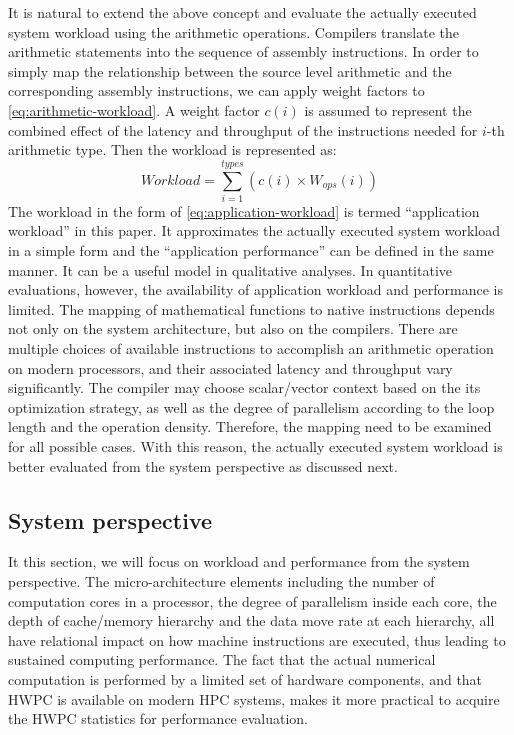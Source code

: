 \documentclass[conference]{IEEEtran}
\begin{document}
It is natural to extend the above concept and evaluate the actually executed
system workload using the arithmetic operations.
Compilers translate the arithmetic statements into the sequence of
assembly instructions.
In order to simply map the relationship between the source level arithmetic
and the corresponding assembly instructions,
we can apply weight factors to \eqref{eq:arithmetic-workload}.
A weight factor $ c(i) $ is assumed to represent the combined effect of
the latency and throughput of the instructions needed for $ i $-th
arithmetic type. %
Then the workload is represented as:
\begin{equation}\label{eq:application-workload}
		Workload = \sum_{i=1}^{types} \left(c(i)\times W_{ops}(i)\right)
\end{equation}
%
The workload in the form of \eqref{eq:application-workload}
is termed ``application workload'' in this paper.
It approximates the actually executed system workload in a simple form
and the ``application performance'' can be defined in the same manner.
It can be a useful model in qualitative analyses.
In quantitative evaluations,  however, the availability of
application workload and performance is limited.
The mapping of mathematical functions to native instructions 
depends not only on the system architecture, but also on the compilers.
There are multiple choices of available instructions to accomplish an
arithmetic operation on modern processors, and their associated latency
and throughput vary significantly.
The compiler may choose scalar/vector context based on
the its optimization strategy, as well as the degree of parallelism
according to the loop length and the operation density.
Therefore, the mapping need to be examined for all possible cases.
With this reason, the actually executed system workload is better evaluated
from the system perspective as discussed next.

%
\subsection{System perspective}
\label{subsection:system-perspective}

It this section, we will focus on workload and performance from
the system perspective.
The micro-architecture elements including the number of computation cores
in a processor, the degree of parallelism inside each core,
the depth of cache/memory hierarchy and the data move rate at each hierarchy,
all have relational impact on how machine instructions are executed,
thus leading to sustained computing performance.
The fact that the actual numerical computation is performed by a
limited set of hardware components, and that HWPC is available
on modern HPC systems, makes it more practical to acquire the HWPC statistics
for performance evaluation.
\end{document}
